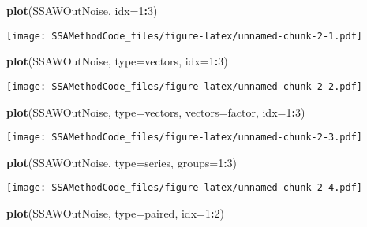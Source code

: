 \documentclass[
]{article}
\newenvironment{Shaded}{\begin{snugshade}}{\end{snugshade}}
\newcommand{\AttributeTok}[1]{\textcolor[rgb]{0.13,0.29,0.53}{#1}}
\newcommand{\DecValTok}[1]{\textcolor[rgb]{0.00,0.00,0.81}{#1}}
\newcommand{\FunctionTok}[1]{\textcolor[rgb]{0.13,0.29,0.53}{\textbf{#1}}}
\newcommand{\NormalTok}[1]{#1}
\newcommand{\SpecialCharTok}[1]{\textcolor[rgb]{0.81,0.36,0.00}{\textbf{#1}}}
\newcommand{\StringTok}[1]{\textcolor[rgb]{0.31,0.60,0.02}{#1}}
\begin{document}
\begin{Shaded}
\begin{Highlighting}[]
\FunctionTok{plot}\NormalTok{(SSAWOutNoise, }\AttributeTok{idx=}\DecValTok{1}\SpecialCharTok{:}\DecValTok{3}\NormalTok{)}
\end{Highlighting}
\end{Shaded}

\texttt{[image: SSAMethodCode\_files/figure-latex/unnamed-chunk-2-1.pdf]}

\begin{Shaded}
\begin{Highlighting}[]
\FunctionTok{plot}\NormalTok{(SSAWOutNoise, }\AttributeTok{type=}\StringTok{\textquotesingle{}vectors\textquotesingle{}}\NormalTok{, }\AttributeTok{idx=}\DecValTok{1}\SpecialCharTok{:}\DecValTok{3}\NormalTok{)}
\end{Highlighting}
\end{Shaded}

\texttt{[image: SSAMethodCode\_files/figure-latex/unnamed-chunk-2-2.pdf]}

\begin{Shaded}
\begin{Highlighting}[]
\FunctionTok{plot}\NormalTok{(SSAWOutNoise, }\AttributeTok{type=}\StringTok{\textquotesingle{}vectors\textquotesingle{}}\NormalTok{, }\AttributeTok{vectors=}\StringTok{\textquotesingle{}factor\textquotesingle{}}\NormalTok{, }\AttributeTok{idx=}\DecValTok{1}\SpecialCharTok{:}\DecValTok{3}\NormalTok{)}
\end{Highlighting}
\end{Shaded}

\texttt{[image: SSAMethodCode\_files/figure-latex/unnamed-chunk-2-3.pdf]}

\begin{Shaded}
\begin{Highlighting}[]
\FunctionTok{plot}\NormalTok{(SSAWOutNoise, }\AttributeTok{type=}\StringTok{\textquotesingle{}series\textquotesingle{}}\NormalTok{, }\AttributeTok{groups=}\DecValTok{1}\SpecialCharTok{:}\DecValTok{3}\NormalTok{)}
\end{Highlighting}
\end{Shaded}

\texttt{[image: SSAMethodCode\_files/figure-latex/unnamed-chunk-2-4.pdf]}

\begin{Shaded}
\begin{Highlighting}[]
\FunctionTok{plot}\NormalTok{(SSAWOutNoise, }\AttributeTok{type=}\StringTok{\textquotesingle{}paired\textquotesingle{}}\NormalTok{, }\AttributeTok{idx=}\DecValTok{1}\SpecialCharTok{:}\DecValTok{2}\NormalTok{)}
\end{Highlighting}
\end{Shaded}
\end{document}
